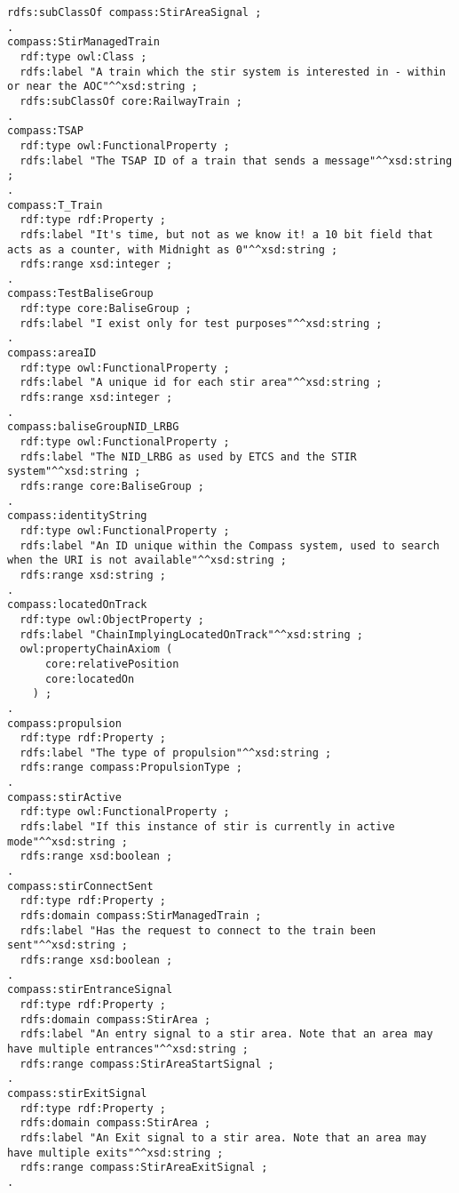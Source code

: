\begin{frame}[fragile]
\begin{lstlisting}[float=b,language=sparql,frame=tb,caption={Mapping of RaCoOn to COMPASS project data},label=lst:racooncompassmap]
  rdfs:subClassOf compass:StirAreaSignal ;
.
compass:StirManagedTrain
  rdf:type owl:Class ;
  rdfs:label "A train which the stir system is interested in - within or near the AOC"^^xsd:string ;
  rdfs:subClassOf core:RailwayTrain ;
.
compass:TSAP
  rdf:type owl:FunctionalProperty ;
  rdfs:label "The TSAP ID of a train that sends a message"^^xsd:string ;
.
compass:T_Train
  rdf:type rdf:Property ;
  rdfs:label "It's time, but not as we know it! a 10 bit field that acts as a counter, with Midnight as 0"^^xsd:string ;
  rdfs:range xsd:integer ;
.
compass:TestBaliseGroup
  rdf:type core:BaliseGroup ;
  rdfs:label "I exist only for test purposes"^^xsd:string ;
.
compass:areaID
  rdf:type owl:FunctionalProperty ;
  rdfs:label "A unique id for each stir area"^^xsd:string ;
  rdfs:range xsd:integer ;
.
compass:baliseGroupNID_LRBG
  rdf:type owl:FunctionalProperty ;
  rdfs:label "The NID_LRBG as used by ETCS and the STIR system"^^xsd:string ;
  rdfs:range core:BaliseGroup ;
.
compass:identityString
  rdf:type owl:FunctionalProperty ;
  rdfs:label "An ID unique within the Compass system, used to search when the URI is not available"^^xsd:string ;
  rdfs:range xsd:string ;
.
compass:locatedOnTrack
  rdf:type owl:ObjectProperty ;
  rdfs:label "ChainImplyingLocatedOnTrack"^^xsd:string ;
  owl:propertyChainAxiom (
      core:relativePosition
      core:locatedOn
    ) ;
.
compass:propulsion
  rdf:type rdf:Property ;
  rdfs:label "The type of propulsion"^^xsd:string ;
  rdfs:range compass:PropulsionType ;
.
compass:stirActive
  rdf:type owl:FunctionalProperty ;
  rdfs:label "If this instance of stir is currently in active mode"^^xsd:string ;
  rdfs:range xsd:boolean ;
.
compass:stirConnectSent
  rdf:type rdf:Property ;
  rdfs:domain compass:StirManagedTrain ;
  rdfs:label "Has the request to connect to the train been sent"^^xsd:string ;
  rdfs:range xsd:boolean ;
.
compass:stirEntranceSignal
  rdf:type rdf:Property ;
  rdfs:domain compass:StirArea ;
  rdfs:label "An entry signal to a stir area. Note that an area may have multiple entrances"^^xsd:string ;
  rdfs:range compass:StirAreaStartSignal ;
.
compass:stirExitSignal
  rdf:type rdf:Property ;
  rdfs:domain compass:StirArea ;
  rdfs:label "An Exit signal to a stir area. Note that an area may have multiple exits"^^xsd:string ;
  rdfs:range compass:StirAreaExitSignal ;
.

\end{lstlisting}
\end{frame}


  



